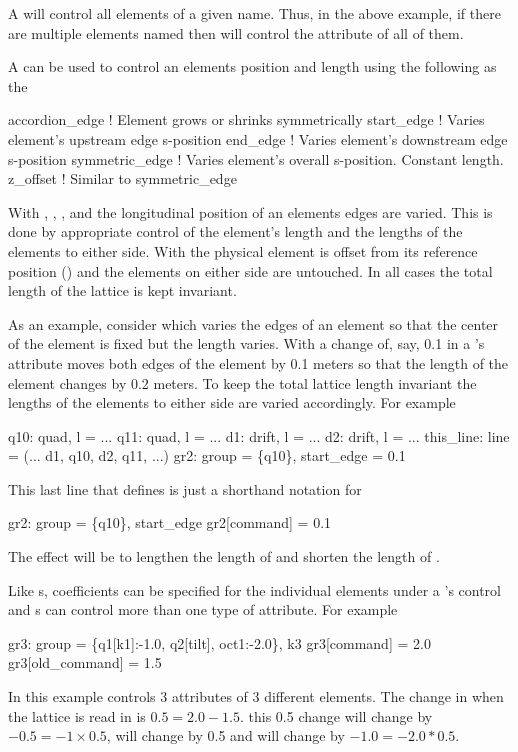 A  will control all elements of a given name. Thus, in
the above example, if there are multiple elements named 
then  will control the   attribute of all of them.

A  can be used to control an elements position and length
using the following as the 
\begin{example}
  accordion_edge  ! Element grows or shrinks symmetrically
  start_edge      ! Varies element's upstream edge s-position
  end_edge        ! Varies element's downstream edge s-position
  symmetric_edge  ! Varies element's overall s-position. Constant length.
  z_offset        ! Similar to symmetric_edge
\end{example}
With , , , and
 the longitudinal position of an elements edges are
varied. This is done by appropriate control of the element's length
and the lengths of the elements to either side. With  the
physical element is offset from its reference position
() and the elements on either side are untouched.
In all cases the total length of the lattice is kept invariant.

As an example, consider  which varies the edges of
an element so that the center of the element is fixed but the length
varies. With  a change of, say, 0.1 in a
's  attribute moves both edges of the element by
0.1 meters so that the length of the element changes by 0.2 meters. To
keep the total lattice length invariant the lengths of the elements to
either side are varied accordingly. For example
\begin{example}
  q10: quad, l = ...
  q11: quad, l = ...
  d1: drift, l = ...
  d2: drift, l = ...
  this_line: line = (... d1, q10, d2, q11, ...)
  gr2: group = \{q10\}, start_edge = 0.1
\end{example}
This last line that defines  is just a shorthand notation for
\begin{example}
  gr2: group = \{q10\}, start_edge 
  gr2[command] = 0.1
\end{example}
The effect will be to lengthen the length of  and shorten the
length of .

Like s, coefficients can be specified for the individual
elements under a 's control and s can control more
than one type of attribute. For example
\begin{example}
  gr3: group = \{q1[k1]:-1.0, q2[tilt], oct1:-2.0\}, k3
  gr3[command] = 2.0
  gr3[old_command] = 1.5
\end{example}
In this example  controls 3 attributes of 3 different
elements. The change in  when the lattice is read in is $0.5
= 2.0 - 1.5$. this 0.5 change will change  by $-0.5 = -1
\times 0.5$,  will change by 0.5 and  will
change by $-1.0 = -2.0 * 0.5$.


